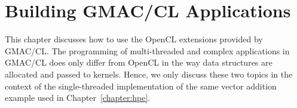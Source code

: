 \chapter{Building GMAC\slash CL Applications}

This chapter discusses how to use the OpenCL extensions provided by GMAC\slash CL. The programming 
of multi\hyp{}threaded and complex applications in GMAC\slash CL does only differ from OpenCL in 
the way data structures are allocated and passed to kernels. Hence, we only discuss these two topics 
in the context of the single\hyp{}threaded implementation of the same vector addition example used 
in Chapter~\ref{chapter:hpe}. 



